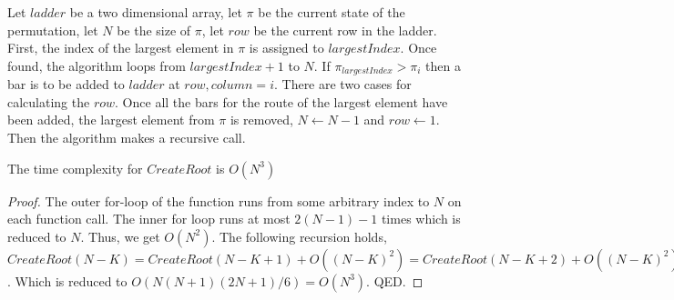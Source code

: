 Let $ladder$ be a two dimensional array, let $\pi$ be the current state of the permutation, let $N$ be the 
size of $\pi$, let $row$ be the current row in the ladder. First, the index of the largest element in $\pi$ is assigned to $largestIndex$. 
Once found, the algorithm loops from $largestIndex+1$ to $N$. If $\pi_{largestIndex}>\pi_{i}$ then a bar is to be added to 
$ladder$ at $row,column=i$. There are two cases for calculating the $row$. 
Once all the bars for the route of the largest element have been added, the largest element from $\pi$ is removed, 
$N \gets N-1$ and $row \gets 1$. Then the algorithm makes a recursive call.

\begin{lemma}
	The time complexity for $CreateRoot$ is $O(N^{3})$
\end{lemma}
\begin{proof}
	The outer for-loop of the function runs from some arbitrary index to $N$ on each function call. The inner for loop runs at most 
	$2(N-1)-1$ times which is reduced to $N$. Thus, we get $O(N^{2})$. The following 
	recursion holds, $CreateRoot(N-K) = CreateRoot(N-K+1) + O((N-K)^{2})=CreateRoot(N-K+2) + O((N-K)^{2}) + O((N-K+1)^{2})\dots $. Which is 
	reduced to $O(N(N+1)(2N+1)/6) = O(N^3)$. QED.
\end{proof}
\pagebreak


